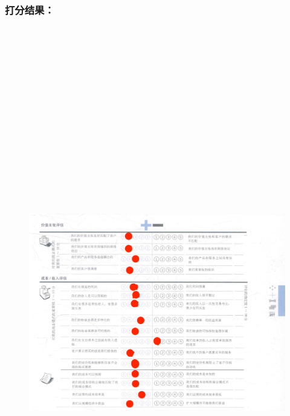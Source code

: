 \documentclass[a4paper,12pt]{article}
\begin{document}
    \subsubsection{打分结果：}
    \begin{figure}[htbp]
        \centering
        \includegraphics[width=15cm,height=25cm]{S&W1.png}
    \end{figure}
\end{document}
